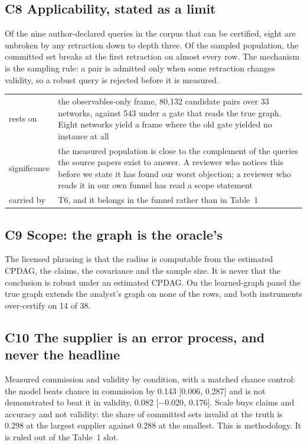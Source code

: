 \subsection*{C8 \quad Applicability, stated as a limit}

Of the nine author-declared queries in the corpus that can be certified, eight are unbroken by any
retraction down to depth three. Of the sampled population, the committed set breaks at the first
retraction on almost every row. The mechanism is the sampling rule: a pair is admitted only when
some retraction changes validity, so a robust query is rejected before it is measured.

\begin{center}\footnotesize
\begin{tabular}{@{}p{2.6cm}p{13.75cm}@{}}
\toprule
rests on & the observables-only frame, 80{,}132 candidate pairs over 33 networks, against 543 under
a gate that reads the true graph. Eight networks yield a frame where the old gate yielded no
instance at all \\
significance & the measured population is close to the complement of the queries the source papers
exist to answer. A reviewer who notices this before we state it has found our worst objection; a
reviewer who reads it in our own funnel has read a scope statement \\
carried by & T6, and it belongs in the funnel rather than in Table~1 \\
\bottomrule
\end{tabular}
\end{center}

\subsection*{C9 \quad Scope: the graph is the oracle's}

The licensed phrasing is that the radius is computable from the estimated CPDAG, the claims, the
covariance and the sample size. It is never that the conclusion is robust under an estimated CPDAG.
On the learned-graph panel the true graph extends the analyst's graph on none of the rows, and both
instruments over-certify on 14 of 38.

\subsection*{C10 \quad The supplier is an error process, and never the headline}

Measured commission and validity by condition, with a matched chance control: the model beats
chance in commission by 0.143 [0.006, 0.287] and is not demonstrated to beat it in validity,
0.082 [$-$0.020, 0.176]. Scale buys claims and accuracy and not validity: the share of committed
sets invalid at the truth is 0.298 at the largest supplier against 0.288 at the smallest. This is
methodology. It is ruled out of the Table~1 slot.

